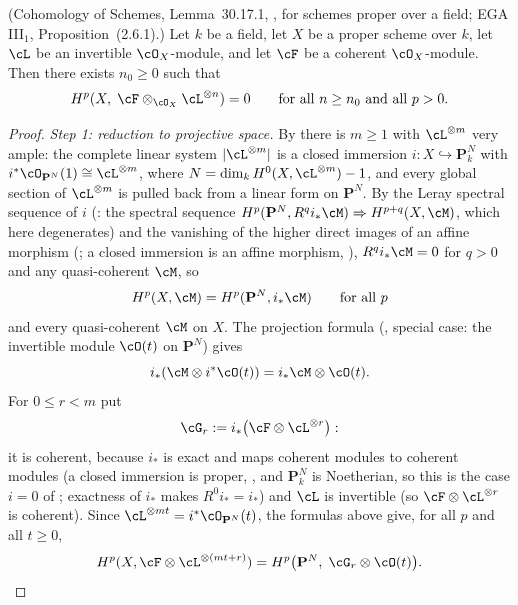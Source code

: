 \begin{lemma}\label{lem:pc-serre-vanishing}
(Cohomology of Schemes, Lemma~30.17.1,
, for schemes
proper over a field; EGA III$_1$, Proposition~(2.6.1).)
Let $k$ be a field, let $X$ be a proper scheme over $k$, let $\cL$ be an
 invertible $\cO_X$-module, and let $\cF$ be a
coherent $\cO_X$-module.  Then there exists $n_0\geq0$ such that
\[
H^p(X,\;\cF\otimes_{\cO_X}\cL^{\otimes n})=0
\qquad\text{for all }n\ge n_0\text{ and all }p>0 .
\]
\end{lemma}
\begin{proof}
\emph{Step 1: reduction to projective space.}  By
 there is $m\ge1$ with $\cL^{\otimes m}$ very
ample: the complete linear system $|\cL^{\otimes m}|$ is a closed
immersion $i:X\hookrightarrow\mathbf P^N_k$ with
$i^*\cO_{\mathbf P^N}(1)\cong\cL^{\otimes m}$, where
$N=\dim_kH^0(X,\cL^{\otimes m})-1$, and every global section of
$\cL^{\otimes m}$ is pulled back from a linear form on
$\mathbf P^N$.  By the Leray spectral sequence of $i$
(: the spectral sequence
$H^p(\mathbf P^N,R^qi_*\cM)\Rightarrow
H^{p+q}(X,\cM)$, which here degenerates) and the vanishing of the
higher direct images of an affine morphism
(; a closed immersion is an affine
morphism, ),
$R^qi_*\cM=0$ for $q>0$ and any quasi-coherent $\cM$, so
\[
H^p(X,\cM)=H^p(\mathbf P^N,i_*\cM)\qquad\text{for all }p
\]
and every quasi-coherent $\cM$ on $X$.  The projection formula
(, special case: the invertible
module $\cO(t)$ on $\mathbf P^N$) gives
\[
i_*(\cM\otimes i^*\cO(t))=i_*\cM\otimes\cO(t) .
\]
For $0\le r<m$ put
\[
\cG_r:=i_*\bigl(\cF\otimes\cL^{\otimes r}\bigr):
\]
it is coherent, because $i_*$ is exact and maps coherent modules to
coherent modules (a closed immersion is proper,
, and $\mathbf P^N_k$ is
Noetherian, so this is the case $i=0$ of ;
exactness of $i_*$ makes $R^0i_*=i_*$) and $\cL$ is
invertible (so $\cF\otimes\cL^{\otimes r}$ is coherent).  Since
$\cL^{\otimes mt}=i^*\cO_{\mathbf P^N}(t)$, the formulas above give,
for all $p$ and all $t\ge0$,
\[
H^p(X,\cF\otimes\cL^{\otimes(mt+r)})
=H^p\bigl(\mathbf P^N,\;\cG_r\otimes\cO(t)\bigr) .
\]


\end{proof}
